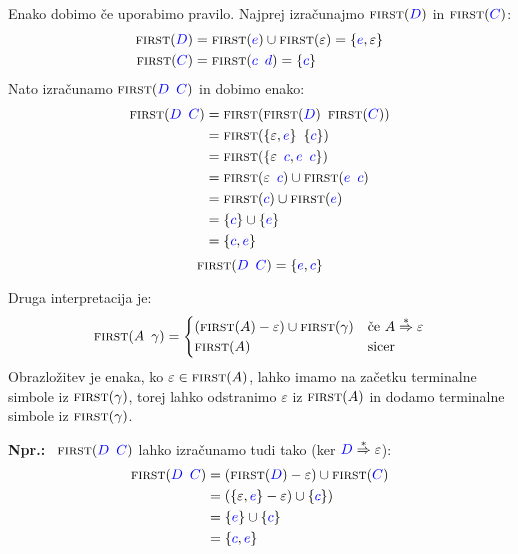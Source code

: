 \documentclass{article}
\newcommand{\Ex}{\textbf{Npr.:}\ }
\newcommand{\FIRST}{\textsc{first}}
\newcommand{\Symbol}[1]{\textcolor{blue}{#1}}
\newcommand{\Null}{\varepsilon}
\newcommand{\DeriveStar}{\overset{\ast}{\Rightarrow}}
\newcommand{\Seq}{{\ \,}}
\begin{document}
  Enako dobimo če uporabimo pravilo.
  Najprej izračunajmo $\FIRST(\Symbol{D})$ in $\FIRST(\Symbol{C})$:
  \begin{align*}
    \FIRST(\Symbol{D}) &= \FIRST(\Symbol{e}) \cup \FIRST(\Null) = \{\Symbol{e}, \Null\}\\
    \FIRST(\Symbol{C}) &= \FIRST(\Symbol{c} \Seq \Symbol{d}) = \{\Symbol{c}\}
  \end{align*}
  Nato izračunamo $\FIRST(\Symbol{D} \Seq \Symbol{C})$ in dobimo enako:
  \begin{equation*}
    \begin{aligned}
      \FIRST(\Symbol{D} \Seq \Symbol{C}) &= \FIRST(\FIRST(\Symbol{D}) \Seq \FIRST(\Symbol{C}))\\
                &= \FIRST(\{\Null, \Symbol{e}\} \Seq \{\Symbol{c}\})\\
                &= \FIRST(\{\Null \Seq \Symbol{c}, \Symbol{e} \Seq \Symbol{c}\})\\
                &= \FIRST(\Null \Seq \Symbol{c}) \cup \FIRST(\Symbol{e} \Seq \Symbol{c})\\
                &= \FIRST(\Symbol{c}) \cup \FIRST(\Symbol{e})\\
                &= \{\Symbol{c}\} \cup \{\Symbol{e}\}\\
                &= \{\Symbol{c}, \Symbol{e}\}
    \end{aligned}
  \end{equation*}
  \begin{equation*}
    \FIRST(\Symbol{D} \Seq \Symbol{C}) = \{\Symbol{e}, \Symbol{c}\}
  \end{equation*}

  Druga interpretacija je:
\begin{equation*}
  \FIRST(A \Seq \gamma) = \begin{cases}
    (\FIRST(A) - \Null) \cup \FIRST(\gamma) & \text{če } A \DeriveStar \Null \\
    \FIRST(A) & \text{sicer} \\
  \end{cases}
\end{equation*}
Obrazložitev je enaka, ko $\Null \in \FIRST(A)$, lahko imamo na začetku terminalne simbole iz $\FIRST(\gamma)$, torej lahko odstranimo $\Null$ iz $\FIRST(A)$ in dodamo terminalne simbole iz $\FIRST(\gamma)$.

\Ex
  $\FIRST(\Symbol{D} \Seq \Symbol{C})$ lahko izračunamo tudi tako (ker $\Symbol{D} \DeriveStar \Null$):
  \begin{equation*}
    \begin{aligned}
      \FIRST(\Symbol{D} \Seq \Symbol{C}) &= (\FIRST(\Symbol{D}) - \Null) \cup \FIRST(\Symbol{C})\\
                &= (\{\Null, \Symbol{e}\} - \Null) \cup \{\Symbol{c}\})\\
                &= \{\Symbol{e}\} \cup \{\Symbol{c}\}\\
                &= \{\Symbol{c}, \Symbol{e}\}
    \end{aligned}
  \end{equation*}
\end{document}
